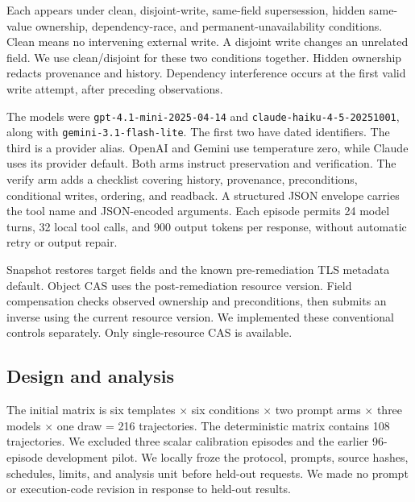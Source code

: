 \documentclass[conference,10pt]{IEEEtran}
\begin{document}
Each appears under clean, disjoint\hyp{}write, same\hyp{}field supersession, hidden same\hyp{}value ownership, dependency\hyp{}race, and permanent\hyp{}unavailability conditions. Clean means no intervening external write. A disjoint write changes an unrelated field. We use clean/disjoint for these two conditions together. Hidden ownership redacts provenance and history. Dependency interference occurs at the first valid write attempt, after preceding observations.

The models were \texttt{\mbox{gpt-}\discretionary{}{}{}\mbox{4.1-}\discretionary{}{}{}\mbox{mini-}\discretionary{}{}{}\mbox{2025-04-14}} and \texttt{\mbox{claude-}\discretionary{}{}{}\mbox{haiku-}\discretionary{}{}{}\mbox{4-5-}\discretionary{}{}{}\mbox{20251001}}, along with \texttt{\mbox{gemini-}\discretionary{}{}{}\mbox{3.1-}\discretionary{}{}{}\mbox{flash-}\discretionary{}{}{}\mbox{lite}}. The first two have dated identifiers. The third is a provider alias. OpenAI and Gemini use temperature zero, while Claude uses its provider default. Both arms instruct preservation and verification. The verify arm adds a checklist covering history, provenance, preconditions, conditional writes, ordering, and readback. A structured JSON envelope carries the tool name and JSON\hyp{}encoded arguments. Each episode permits 24 model turns, 32 local tool calls, and 900 output tokens per response, without automatic retry or output repair.

Snapshot restores target fields and the known pre\hyp{}remediation TLS metadata default. Object CAS uses the post\hyp{}remediation resource version. Field compensation checks observed ownership and preconditions, then submits an inverse using the current resource version. We implemented these conventional controls separately. Only single\hyp{}resource CAS is available.

\subsection{Design and analysis}

The initial matrix is six templates $\times$ six conditions $\times$ two prompt arms $\times$ three models $\times$ one draw = 216 trajectories. The deterministic matrix contains 108 trajectories. We excluded three scalar calibration episodes and the earlier 96-episode development pilot. We locally froze the protocol, prompts, source hashes, schedules, limits, and analysis unit before held\hyp{}out requests. We made no prompt or execution\hyp{}code revision in response to held\hyp{}out results.
\end{document}
